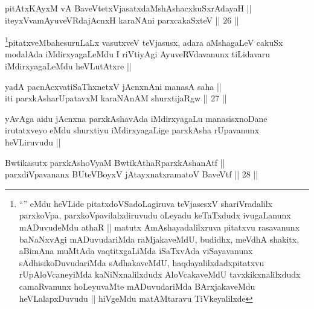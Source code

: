 \begin{shl}
pitAtxKAyxM vA BaveVtetxVjasatxdaMshAshacxkuSxrAdayaH ||  \\
iteyxVvamAyuveVRdajAcnxH karaNAni parxcakaSxteV ||  26 ||  
\end{shl}

\begin{artha}
\footnote[1]{``\stext'' eMdu heVLide pitatxdoVSadoLagiruva teVjasesxV
shariVradalilx parxkoVpa, parxkoVpavilalxdiruvudu oLeyadu keTaTxdudx
ivugaLanunx mADuvudeMdu athaR || matutx AmAshayadalilxruva pitatxvu rasavanunx baNaNxvAgi
mADuvudariMda raMjakaveMdU, budidhx, meVdhA shakitx, aBimAna muMtAda
vaqtitxgaLiMda iSaTxvAda viSayavanunx sAdhisikoDuvudariMda
sAdhakaveMdU, haqdayalilxdadxpitatxvu rUpAloVcaneyiMda
kaNiNxnalilxdudx AloVcakaveMdU tavxkikxnalilxdudx camaRvanunx
hoLeyuvaMte mADuvudariMda BArxjakaveMdu heVLalapxDuvudu || hiVgeMdu
matAMtaravu TiVkeyalilxde}pitatxveMbahesuruLaLx vasutxveV teVjasusx, adara aMshagaLeV cakuSx
modalAda iMdirxyagaLeMdu I riVtiyAgi AyuveRVdavanunx tiLidavaru
iMdirxyagaLeMdu heVLutAtxre ||
\end{artha}


\begin{shl}
yadA pacnAcxvatiSaThxnetxV jAcnxnAni manasA saha || \\
iti parxkAsharUpatavxM karaNAnAM shurxtijaRgw ||  27 ||  
\end{shl}

\begin{artha}
yAvAga aidu jAcnxna parxkAshavAda iMdirxyagaLu manasisxnoDane
irutatxveyo eMdu shurxtiyu iMdirxyagaLige parxkAsha rUpavanunx
heVLiruvudu ||
\end{artha}

\begin{shl}
Bwtikasutx parxkAshoV\s yaM BwtikAthaRparxkAshanAtf || \\
parxdiVpavananx BUteVBoyxV jAtayxnatxramatoV BaveVtf ||  28 ||  
\end{shl}

